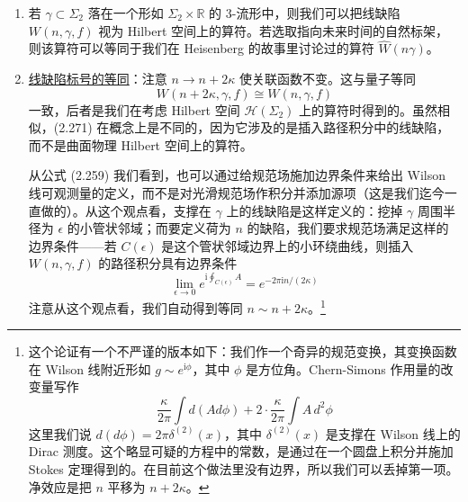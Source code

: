\begin{enumerate}
  \item 若 $\gamma\subset\Sigma_2$ 落在一个形如 $\Sigma_2\times\mathbb{R}$ 的 3-流形中，则我们可以把线缺陷 $W(n,\gamma,f)$ 视为 Hilbert 空间上的算符。若选取指向未来时间的自然标架，则该算符可以等同于我们在 Heisenberg 的故事里讨论过的算符 $\widehat{W}(n\gamma)$。

  \item \underline{线缺陷标号的等同}：注意 $n\to n+2\kappa$ 使关联函数不变。这与量子等同
  \begin{equation}
    W(n+2\kappa,\gamma,f)\cong W(n,\gamma,f)
    \tag{2.271}
    \label{eq:2.271}
  \end{equation}
  一致，后者是我们在考虑 Hilbert 空间 $\mathcal{H}(\Sigma_2)$ 上的算符时得到的。虽然相似，(2.271) 在概念上是不同的，因为它涉及的是插入路径积分中的线缺陷，而不是曲面物理 Hilbert 空间上的算符。

  从公式 (2.259) 我们看到，也可以通过给规范场施加边界条件来给出 Wilson 线可观测量的定义，而不是对光滑规范场作积分并添加源项（这是我们迄今一直做的）。从这个观点看，支撑在 $\gamma$ 上的线缺陷是这样定义的：挖掉 $\gamma$ 周围半径为 $\epsilon$ 的小管状邻域；而要定义荷为 $n$ 的缺陷，我们要求规范场满足这样的边界条件——若 $C(\epsilon)$ 是这个管状邻域边界上的小环绕曲线，则插入 $W(n,\gamma,f)$ 的路径积分具有边界条件
  \begin{equation}
    \lim_{\epsilon\to0}e^{\mathrm{i}\oint_{C(\epsilon)}A}=e^{-2\pi\mathrm{i}n/(2\kappa)}
    \tag{2.272}
    \label{eq:2.272}
  \end{equation}
  注意从这个观点看，我们自动得到等同 $n\sim n+2\kappa$。\footnote{这个论证有一个不严谨的版本如下：我们作一个奇异的规范变换，其变换函数在 Wilson 线附近形如 $g\sim e^{\mathrm{i}\phi}$，其中 $\phi$ 是方位角。Chern-Simons 作用量的改变量写作
  \begin{equation}
    \frac{\kappa}{2\pi}\int d(Ad\phi)+2\cdot\frac{\kappa}{2\pi}\int A\,d^{2}\phi
    \tag{2.273}
    \label{eq:2.273}
  \end{equation}
  这里我们说 $d(d\phi)=2\pi\delta^{(2)}(x)$，其中 $\delta^{(2)}(x)$ 是支撑在 Wilson 线上的 Dirac 测度。这个略显可疑的方程中的常数，是通过在一个圆盘上积分并施加 Stokes 定理得到的。在目前这个做法里没有边界，所以我们可以丢掉第一项。净效应是把 $n$ 平移为 $n+2\kappa$。}


\end{enumerate}
